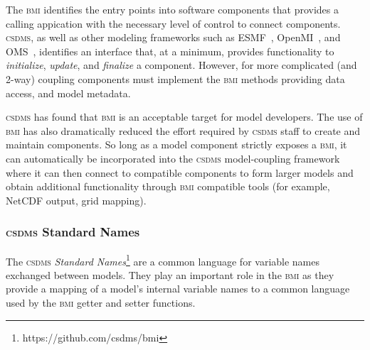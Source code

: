 \documentclass[11pt, oneside]{amsart}
\newcommand{\huttonnote}[1]{ {\textcolor{magenta}    { ***Eric:      #1 }}}
\DeclareRobustCommand{\csdms}{\textsc{csdms}}
\DeclareRobustCommand{\bmi}{\textsc{bmi}}
\begin{document}
The \bmi{} identifies the entry points into software components that provides a
calling appication with the necessary level of control to connect components.
\csdms, as well as other modeling frameworks such as
ESMF~\cite{hill2004architecture}, OpenMI~\cite{gregersen2007openmi}, and
OMS~\cite{david2002object}, identifies an interface that, at a minimum,
provides functionality to \emph{initialize}, \emph{update}, and
\emph{finalize} a component. However, for more complicated (and 2-way)
coupling components must implement the \bmi{} methods providing data access,
and model metadata.

\csdms{} has found that \bmi{} is an acceptable target for model developers.
The use of \bmi{} has also dramatically reduced the effort required by
\csdms{} staff to create and maintain components. So long as a model component
strictly exposes a \bmi{}, it can automatically be incorporated into the
\csdms{} model-coupling framework where it can then connect to compatible
components to form larger models and obtain additional functionality through
\bmi{} compatible tools (for example, NetCDF output, grid mapping).



\subsubsection{\csdms{} Standard Names}
\label{sec:standardnames}


The \csdms{} \emph{Standard Names}\footnote{https://github.com/csdms/bmi}
are a common language for variable names exchanged between models. They play
an important role in the \bmi{} as they provide a mapping of a model's
internal variable names to a common language used by the \bmi{} getter and
setter functions.
\end{document}
